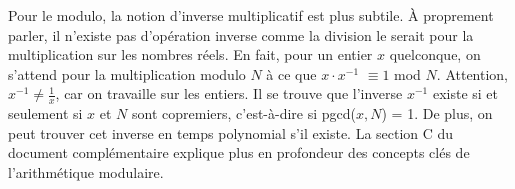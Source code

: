 Pour le modulo, la notion d'inverse multiplicatif est plus subtile. À proprement parler, il n'existe pas d'opération inverse comme la division le serait pour la multiplication sur les nombres réels. En fait, pour un entier $x$ quelconque, on s'attend pour la multiplication modulo $N$ à ce que $x\cdot x^{-1}$ $ \equiv 1$ mod $N$. Attention, $x^{-1} \neq \frac{1}{x}$, car on travaille sur les entiers. Il se trouve que l'inverse $x^{-1}$ existe si et seulement si $x$ et $N$ sont copremiers, c'est-à-dire si pgcd($x ,N$) = 1. De plus, on peut trouver cet inverse en temps polynomial s'il existe. La section C du document complémentaire explique plus en profondeur des concepts clés de l'arithmétique modulaire.

























